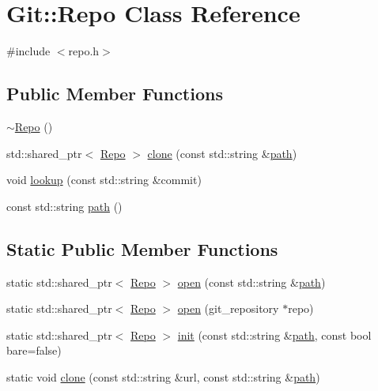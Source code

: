 \hypertarget{class_git_1_1_repo}{\section{Git\-:\-:Repo Class Reference}
\label{class_git_1_1_repo}
}


{\ttfamily \#include $<$repo.\-h$>$}

\subsection*{Public Member Functions}
\begin{DoxyCompactItemize}
\item 
\hyperlink{class_git_1_1_repo_a7040a7f21faf730376faaa97fecbf59b}{$\sim$\-Repo} ()
\item 
std\-::shared\-\_\-ptr$<$ \hyperlink{class_git_1_1_repo}{Repo} $>$ \hyperlink{class_git_1_1_repo_a1ce0dc274b2a8bf8d78bf2f2627a295d}{clone} (const std\-::string \&\hyperlink{class_git_1_1_repo_a2f1d8cc3ef5c9ca9d57738463e75566a}{path})
\item 
void \hyperlink{class_git_1_1_repo_a2a005418aa8a835d22fac189dcbd3975}{lookup} (const std\-::string \&commit)
\item 
const std\-::string \hyperlink{class_git_1_1_repo_a2f1d8cc3ef5c9ca9d57738463e75566a}{path} ()
\end{DoxyCompactItemize}
\subsection*{Static Public Member Functions}
\begin{DoxyCompactItemize}
\item 
static std\-::shared\-\_\-ptr$<$ \hyperlink{class_git_1_1_repo}{Repo} $>$ \hyperlink{class_git_1_1_repo_a6961faf15258c296804fecd4cefce241}{open} (const std\-::string \&\hyperlink{class_git_1_1_repo_a2f1d8cc3ef5c9ca9d57738463e75566a}{path})
\item 
static std\-::shared\-\_\-ptr$<$ \hyperlink{class_git_1_1_repo}{Repo} $>$ \hyperlink{class_git_1_1_repo_a10fb7c3b59fbeace3e97918df0f3eb71}{open} (git\-\_\-repository $\ast$repo)
\item 
static std\-::shared\-\_\-ptr$<$ \hyperlink{class_git_1_1_repo}{Repo} $>$ \hyperlink{class_git_1_1_repo_a5af0323c729f2387a557095dd43f592e}{init} (const std\-::string \&\hyperlink{class_git_1_1_repo_a2f1d8cc3ef5c9ca9d57738463e75566a}{path}, const bool bare=false)
\item 
static void \hyperlink{class_git_1_1_repo_ae9021cc783b808df5a5f556c7c7af5c7}{clone} (const std\-::string \&url, const std\-::string \&\hyperlink{class_git_1_1_repo_a2f1d8cc3ef5c9ca9d57738463e75566a}{path})
\end{DoxyCompactItemize}


